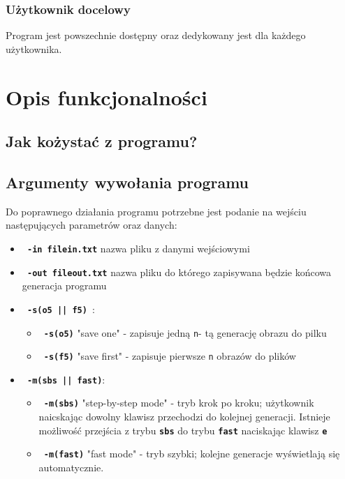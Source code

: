 \documentclass{article}
\begin{document}
\subsubsection{U\.zytkownik docelowy}
\quad Program jest powszechnie dost\k{e}pny oraz dedykowany jest dla ka\.zdego u\.zytkownika.




\section{Opis funkcjonalno\'sci}
\subsection{Jak ko\.zysta\'c z programu?}
\subsection{Argumenty wywo\l{}ania programu}
Do poprawnego dzia\l{}ania programu potrzebne jest podanie na wej\'sciu nast\k{e}puj\k{a}cych parametr\'ow oraz danych:
\begin{itemize}
	\item \textbf{\texttt{ -in filein.txt}} nazwa pliku z danymi wej\'sciowymi
	\item \textbf{\texttt{ -out fileout.txt}} nazwa pliku do kt\'orego zapisywana b\k{e}dzie ko\'ncowa generacja programu
	\item \textbf{\texttt{ -s(o5 || f5) }}:
		\begin{itemize}
			\item \textbf{\texttt{ -s(o5)}} "save one" - zapisuje jedn\k{a} \texttt{n}- t\k{a} generacj\k{e} obrazu do pilku 
			\item \textbf{\texttt{ -s(f5)}} "save first" - zapisuje pierwsze \texttt{n} obraz\'ow do plik\'ow
		\end{itemize}
	\item \textbf{\texttt{ -m(sbs || fast)}}:
		\begin{itemize}
			\item \textbf{\texttt{ -m(sbs)}} "step-by-step mode" - tryb krok po kroku; u\.zytkownik naicskaj\k{a}c dowolny klawisz przechodzi do kolejnej generacji. Istnieje mo\.zliwo\'s\'c przej\'scia z trybu \texttt{\textbf{sbs}} do trybu \texttt{\textbf{fast}} naciskaj\k{a}c klawisz \texttt{\textbf{e}}
			\item \textbf{\texttt{ -m(fast)}} "fast mode" - tryb szybki; kolejne generacje wy\'swietlaj\k{a} si\k{e} automatycznie.
		\end{itemize}

\end{itemize}
\end{document}
